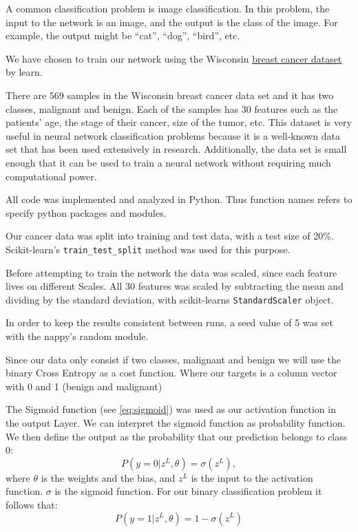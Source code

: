 A common classification problem is image classification. In
this problem, the input to the network is an image, and the output is the class
of the image. For example, the output might be “cat”, “dog”, “bird”, etc.

We have chosen to train our network using the Wisconsin 
\href{https://scikit-learn.org/stable/modules/generated/sklearn.datasets.load\_breast\_cancer.html?fbclid=IwAR0RNzOImikVXi41ecb14u\_qvUDybyIII43e9ySk0GEjyYWyPzybmmHeQWs}{\underline{breast
cancer dataset}} by learn.

There are 569 samples in the Wisconsin breast cancer data set and it has two
classes, malignant and benign. Each of the samples has 30 features such as the
patients’ age, the stage of their cancer, size of the tumor, etc. This dataset
is very useful in neural network classification problems because it is a well-known
data set that has been used extensively in research. Additionally, the data set
is small enough that it can be used to train a neural network without requiring
much computational power.





All code was implemented and analyzed in Python. Thus function names refers to
specify python packages and modules.  

Our cancer data was split into training and test data, with a test size of
20\%. 
Scikit-learn's \verb|train_test_split| method was used for this purpose. 


Before attempting to train the network the data was scaled, since each
feature lives on different Scales. All 30 features was scaled by subtracting
the mean and dividing by the standard deviation, with scikit-learns
\verb|StandardScaler| object. 

In order to keep the results consistent between runs, a seed value of 5 was set
with the nappy's random module. 


Since our data only consist if two classes, malignant and benign we will use
the binary Cross Entropy as a cost function. Where our targets is a column vector
with 0 and 1 (benign and malignant) %



The Sigmoid function (see \eqref{eq:sigmoid}) was used as our activation
function in the output Layer.
We can interpret the sigmoid function as probability function. 
We then define the output as the probability that our prediction belongs to
class 0: 
\begin{equation*}
    P(y = 0 | z^L, \theta ) = \sigma (z^L),
\end{equation*}
where $\theta $ is the weights and the bias, and $z^L$  is the input to the
activation function. $\sigma $ is the sigmoid function. 
For our binary classification problem it follows that: 
\begin{equation*}
    P(y = 1 | z^L, \theta ) = 1 - \sigma (z^L)
\end{equation*}


